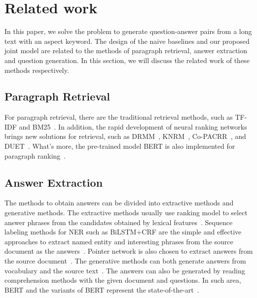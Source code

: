 \section{Related work}
\label{sec:related}


In this paper, we solve the problem to generate question-answer pairs from a long text with an aspect keyword.
The design of the naive baselines and our proposed joint model are related to the methods of paragraph retrieval, answer extraction and question generation.
In this section, we will discuss the related work of these methods respectively.

\subsection{Paragraph Retrieval}
For paragraph retrieval, there are the traditional retrieval methods, such as TF-IDF and BM25~\cite{robertson2009probabilistic}. 
In addition, the rapid development of neural ranking networks brings new solutions for retrieval, such as DRMM~\cite{guo2016deep}, KNRM~\cite{xiong2017end}, Co-PACRR~\cite{hui2018co}, and DUET~\cite{mitra2017learning}.
What's more, the pre-trained model BERT is also implemented for paragraph ranking~\cite{nogueira2019passage,qiao2019understanding}.

\subsection{Answer Extraction}
The methods to obtain answers can be divided into extractive methods and generative methods. 
The extractive methods usually use ranking model to select answer phrases from the candidates obtained by lexical features~\cite{witten2005kea,liu2011automatic,wang2016ptr,subramanian2017neural}.
Sequence labeling methods for NER such as BiLSTM+CRF are the simple and effective approaches to extract named entity and interesting phrases from the source document as the answers~\cite{lample2016neural}.
Pointer network is also chosen to extract answers from the source document~\cite{subramanian2017neural}.
The generative methods can both generate answers from vocabulary and the source text~\cite{meng2017deep,chen2018keyphrase,ye2018semi}.
The answers can also be generated by reading comprehension methods with the given document and questions.
In such area, BERT and the variants of BERT represent the state-of-the-art~\cite{devlin2018bert,lan2019albert}.
